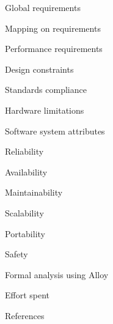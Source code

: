 \documentclass{article}
\begin{document}
\begin{legal}
\begin{legal}
\begin{legal}
			\item Global requirements
			\item Mapping on requirements
			\end{legal}
		\item Performance requirements
		\item Design constraints
			\begin{legal}
			\item Standards compliance
			\item Hardware limitations
  			\end{legal}
		\item Software system attributes
			\begin{legal}
			\item Reliability
			\item Availability
			\item Maintainability
			\item Scalability
			\item Portability
			\item Safety
  			\end{legal}
  		\end{legal}
	\item Formal analysis using Alloy
  	\item Effort spent
	\item References
	\end{legal}
\end{document}
